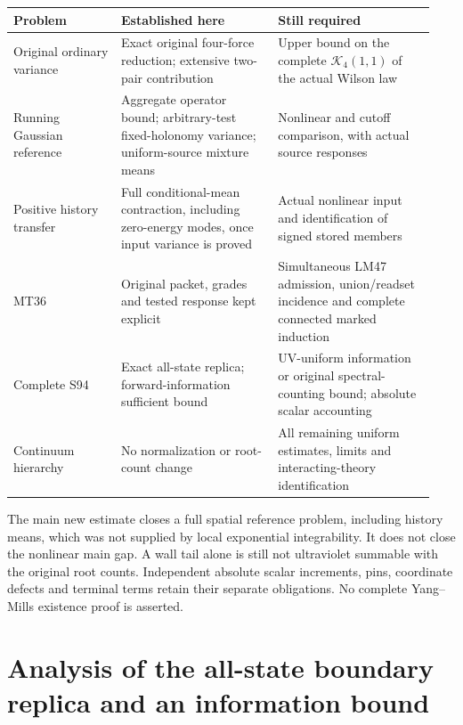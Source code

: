 \documentclass[11pt,letterpaper]{article}
\theoremstyle{remark}\newtheorem{remark}[theorem]{Remark}
\newcommand{\cK}{\mathcal K}\newcommand{\cC}{\mathcal C}
\begin{document}
\begin{center}
\small
\begin{tabular}{@{}>{\raggedright\arraybackslash}p{0.24\linewidth}>{\raggedright\arraybackslash}p{0.35\linewidth}>{\raggedright\arraybackslash}p{0.35\linewidth}@{}}
\toprule
Problem & Established here & Still required\\
\midrule
Original ordinary variance & Exact original four-force reduction; extensive two-pair contribution & Upper bound on the complete \(\cK_4(1,1)\) of the actual Wilson law\\[5pt]
Running Gaussian reference & Aggregate operator bound; arbitrary-test fixed-holonomy variance; uniform-source mixture means & Nonlinear and cutoff comparison, with actual source responses\\[5pt]
Positive history transfer & Full conditional-mean contraction, including zero-energy modes, once input variance is proved & Actual nonlinear input and identification of signed stored members\\[5pt]
MT36 & Original packet, grades and tested response kept explicit & Simultaneous LM47 admission, union/readset incidence and complete connected marked induction\\[5pt]
Complete S94 & Exact all-state replica; forward-information sufficient bound & UV-uniform information or original spectral-counting bound; absolute scalar accounting\\[5pt]
Continuum hierarchy & No normalization or root-count change & All remaining uniform estimates, limits and interacting-theory identification\\
\bottomrule
\end{tabular}
\end{center}

The main new estimate closes a full spatial reference problem, including history means, which was not supplied by local exponential integrability. It does not close the nonlinear main gap. A wall tail alone is still not ultraviolet summable with the original root counts. Independent absolute scalar increments, pins, coordinate defects and terminal terms retain their separate obligations. No complete Yang--Mills existence proof is asserted.

\clearpage
\appendix
\section{Analysis of the all-state boundary replica and an information bound}
\end{document}
